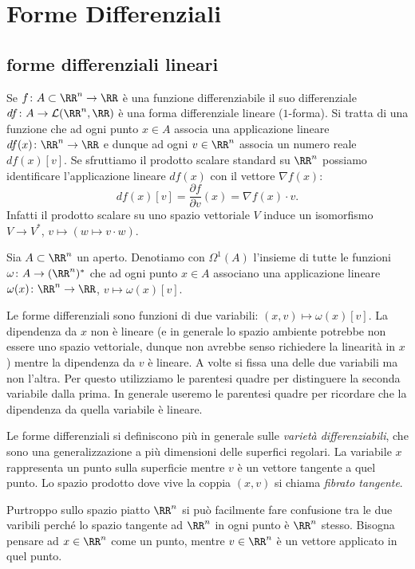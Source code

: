 \chapter{Forme Differenziali} 

\section{forme differenziali lineari}

Se $f\colon A\subset \RR^n \to \RR$ è una funzione differenziabile il suo 
differenziale $df \colon A \to \mathcal L (\RR^n, \RR)$ è una forma differenziale lineare
($1$-forma).
Si tratta di una funzione che ad ogni punto $x\in A$ associa una applicazione lineare 
$df(x)\colon \RR^n \to \RR$ e dunque ad ogni $v\in \RR^n$ associa un numero reale 
$df(x)[v]$. 
Se sfruttiamo il prodotto scalare standard su $\RR^n$ 
possiamo identificare l'applicazione lineare $df(x)$ con il vettore $\nabla f(x)$:
\[
    df(x)[v] = \frac{\partial f}{\partial v}(x) = \nabla f(x) \cdot v.
\]
Infatti il prodotto scalare su uno spazio vettoriale $V$ 
induce un isomorfismo $V \to V^*$, $v \mapsto (w \mapsto v \cdot w)$.

\begin{definition}
    Sia $A\subset \RR^n$ un aperto.
    Denotiamo con $\Omega^1(A)$ l'insieme di tutte le funzioni $\omega\colon A \to (\RR^n)^*$
    che ad ogni punto $x\in A$ associano una applicazione lineare $\omega(x)\colon \RR^n \to \RR$,
    $v\mapsto \omega(x)[v]$.
\end{definition}

\begin{remark}
Le forme differenziali sono funzioni di due variabili: $(x,v)\mapsto \omega(x)[v]$.
La dipendenza da $x$ non è lineare (e in generale lo spazio ambiente potrebbe non essere uno 
spazio vettoriale, dunque non avrebbe senso richiedere la linearità in $x$)
mentre la dipendenza da $v$ è lineare. 
A volte si fissa una delle due variabili ma non l'altra.
Per questo utilizziamo le parentesi quadre per distinguere la seconda variabile dalla prima.
In generale useremo le parentesi quadre per ricordare che la dipendenza da quella variabile è lineare.

Le forme differenziali si definiscono più in generale sulle \emph{varietà differenziabili}, che sono una 
generalizzazione a più dimensioni delle superfici regolari.
La variabile $x$ rappresenta un punto sulla superficie mentre $v$ è un vettore tangente 
a quel punto. Lo spazio prodotto dove vive la coppia $(x,v)$ si chiama \emph{fibrato tangente}.

Purtroppo sullo spazio piatto $\RR^n$ si può facilmente fare confusione tra le due varibili 
perché lo spazio tangente ad $\RR^n$ in ogni punto è $\RR^n$ stesso.
Bisogna pensare ad $x\in \RR^n$ come un punto, 
mentre $v\in \RR^n$ è un vettore applicato in quel punto.
\end{remark}

